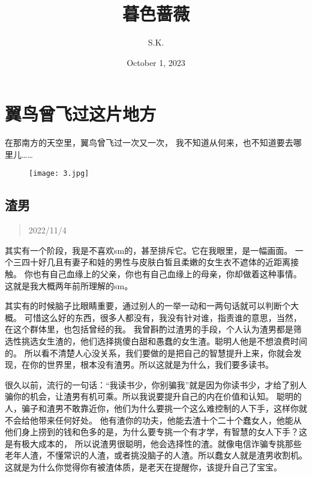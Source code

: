 \documentclass[cn,12pt]{elegantbook}
\begin{document}
\title{暮色蔷薇}
\author{S.K.}
\date{October 1, 2023}


  \maketitle%

\frontmatter
  \tableofcontents%
\mainmatter




\chapter{翼鸟曾飞过这片地方}
在那南方的天空里，翼鸟曾飞过一次又一次，
我不知道从何来，也不知道要去哪里儿……

\vspace{3em}

\begin{figure}[H]
  \texttt{[image: 3.jpg]} 
\end{figure}  

\newpage
\section{渣男}
\begin{quotation}
  2022/11/4
\end{quotation}

其实有一个阶段，我是不喜欢sm的，甚至排斥它。它在我眼里，是一幅画面。
一个三四十好几且有妻子和娃的男性与皮肤白皙且柔嫩的女生衣不遮体的近距离接触。
你也有自己血缘上的父亲，你也有自己血缘上的母亲，你却做着这种事情。这就是我大概两年前所理解的sm。

其实有的时候脑子比眼睛重要，通过别人的一举一动和一两句话就可以判断个大概。
可惜这么好的东西，很多人都没有，我没有针对谁，指责谁的意思，当然，在这个群体里，也包括曾经的我。    
我曾斟酌过渣男的手段，个人认为渣男都是筛选性挑选女生渣的，他们选择挑傻白甜和愚蠢的女生渣。聪明人他是不想浪费时间的。
所以看不清楚人心没关系，我们要做的是把自己的智慧提升上来，你就会发现，在你的世界里，根本没有渣男。所以这就是为什么，我们要多读书。

很久以前，流行的一句话：“我读书少，你别骗我”就是因为你读书少，才给了别人骗你的机会，让渣男有机可乘。所以我说要提升自己的内在价值和认知。
聪明的人，骗子和渣男不敢靠近你，他们为什么要挑一个这么难控制的人下手，这样你就不会给他带来任何好处。
他有渣你的功夫，他能去渣十个二十个蠢女人，他能从他们身上捞到的钱和色多的是，为什么要专挑一个有才学，有智慧的女人下手？这是有极大成本的，
所以说渣男很聪明，他会选择性的渣。就像电信诈骗专挑那些老年人渣，不懂常识的人渣，或者挑没脑子的人渣。所以蠢女人就是渣男收割机。
这就是为什么你觉得你有被渣体质，是老天在提醒你，该提升自己了宝宝。
\end{document}
